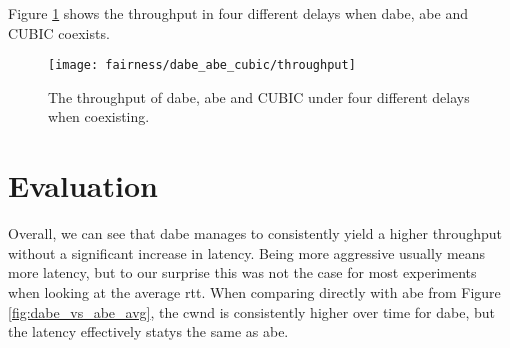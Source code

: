 Figure \ref{fig:dabe_abe_cubic_throughput} shows the throughput in four different delays when \gls{dabe}, \gls{abe} and CUBIC coexists.

\begin{figure}[H]
    \centering
    \texttt{[image: fairness/dabe\_abe\_cubic/throughput]}
    \captionsetup{width=1.0\linewidth}
    \caption{The throughput of \gls{dabe}, \gls{abe} and CUBIC under four different delays when coexisting.}
    \label{fig:dabe_abe_cubic_throughput}
\end{figure}







\section{Evaluation}

Overall, we can see that \gls{dabe} manages to consistently yield a higher throughput without a significant increase in latency. Being more aggressive usually means more latency, but to our surprise this was not the case for most experiments when looking at the average \gls{rtt}. When comparing directly with \gls{abe} from Figure \ref{fig:dabe_vs_abe_avg}, the \gls{cwnd} is consistently higher over time for \gls{dabe}, but the latency effectively statys the same as \gls{abe}.

